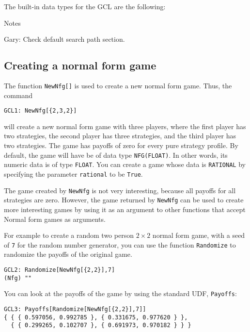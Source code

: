 The built-in data types for the GCL are the following:  










Notes

Gary:  Check default search path section.  




\subsection{Creating a normal form game}

The function \verb+NewNfg[]+ is used to create a new normal form game.
Thus, the command

\begin{verbatim}
GCL1: NewNfg[{2,3,2}]
\end{verbatim}

\noindent 
will create a new normal form game with three players, where the first
player has two strategies, the second player has three strategies, and
the third player has two strategies.  The game has payoffs of zero for
every pure strategy profile.  By default, the game will have be of
data type \verb+NFG(FLOAT)+.  In other words, its numeric data is of
type \verb+FLOAT+.  You can create a game whose data is
\verb+RATIONAL+ by specifying the parameter \verb+rational+ to be
\verb+True+.

The game created by \verb+NewNfg+ is not very interesting, because all
payoffs for all strategies are zero.  However, the game returned by
\verb+NewNfg+ can be used to create more interesting games by using it
as an argument to other functions that accept Normal form games as
arguments.

For example to create a random two person $2\times 2$ normal form
game, with a seed of \verb+7+ for the random number generator, you can
use the function \verb+Randomize+ to randomize the payoffs of the
original game.

\begin{verbatim}
GCL2: Randomize[NewNfg[{2,2}],7]
(Nfg) ""
\end{verbatim}  

\noindent
You can look at the payoffs of the game by using the standard UDF,
\verb+Payoffs+:

\begin{verbatim}
GCL3: Payoffs[Randomize[NewNfg[{2,2}],7]]
{ { { 0.597056, 0.992785 }, { 0.331675, 0.977620 } },
  { { 0.299265, 0.102707 }, { 0.691973, 0.970182 } } }
\end{verbatim}  

